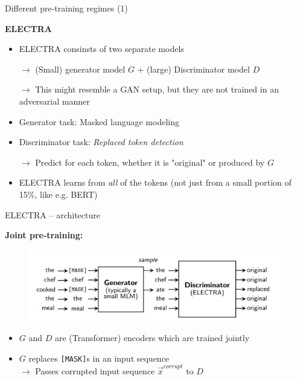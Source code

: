\begin{frame}{Different pre-training regimes (1)}

\vfill

	\textbf{ELECTRA} 

	\begin{itemize}
		\item ELECTRA consinsts of two separate models
		\item[$\to$] (Small) generator model $G$ + (large) Discriminator model $D$
		\item[$\to$] This might resemble a GAN setup, but they are not trained in an adversarial manner
		\item Generator task: Masked language modeling
		\item Discriminator task: \textit{Replaced token detection}
		\item[$\to$] Predict for each token, whether it is "original" or produced by $G$
		\item ELECTRA learns from \textit{all} of the tokens (not just from a small portion of 15\%, like e.g. BERT)
	\end{itemize}
	
\vfill

\end{frame}


\begin{frame}{ELECTRA -- architecture}
	
\vfill

	\textbf{Joint pre-training:}
	
	\begin{figure}
		\centering
		\includegraphics[width = 11cm]{figure/61-electra.png}\\ 
	\end{figure}	
	
	\begin{itemize}
		\item $G$ and $D$ are (Transformer) encoders which are trained jointly
		\item $G$ replaces \texttt{[MASK]}s in an input sequence\\
					$\rightarrow$ Passes corrupted input sequence $\vec{x}^{corrupt}$ to $D$	
	\end{itemize}

\vfill

\end{frame}

